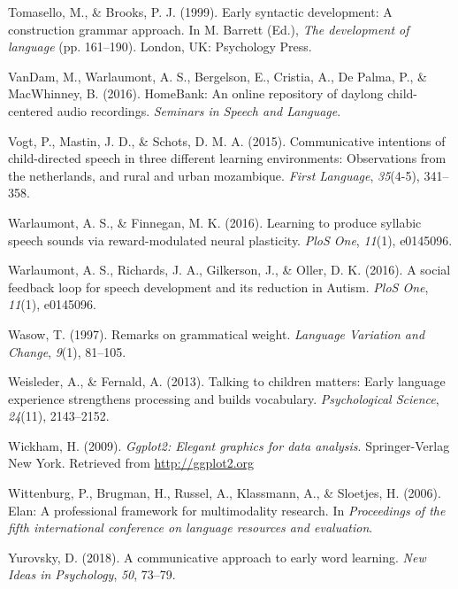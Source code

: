 \documentclass[floatsintext,man]{apa6}
\theoremstyle{definition}
\theoremstyle{definition}
\theoremstyle{definition}
\theoremstyle{remark}
\begin{document}
\hypertarget{ref-tomasello1999early}{}
Tomasello, M., \& Brooks, P. J. (1999). Early syntactic development: A
construction grammar approach. In M. Barrett (Ed.), \emph{The
development of language} (pp. 161--190). London, UK: Psychology Press.

\hypertarget{ref-HomeBank}{}
VanDam, M., Warlaumont, A. S., Bergelson, E., Cristia, A., De Palma, P.,
\& MacWhinney, B. (2016). HomeBank: An online repository of daylong
child-centered audio recordings. \emph{Seminars in Speech and Language}.

\hypertarget{ref-vogt2015communicative}{}
Vogt, P., Mastin, J. D., \& Schots, D. M. A. (2015). Communicative
intentions of child-directed speech in three different learning
environments: Observations from the netherlands, and rural and urban
mozambique. \emph{First Language}, \emph{35}(4-5), 341--358.

\hypertarget{ref-warlaumont2016learning}{}
Warlaumont, A. S., \& Finnegan, M. K. (2016). Learning to produce
syllabic speech sounds via reward-modulated neural plasticity.
\emph{PloS One}, \emph{11}(1), e0145096.

\hypertarget{ref-warlaumont2014social}{}
Warlaumont, A. S., Richards, J. A., Gilkerson, J., \& Oller, D. K.
(2016). A social feedback loop for speech development and its reduction
in Autism. \emph{PloS One}, \emph{11}(1), e0145096.

\hypertarget{ref-wasow1997remarks}{}
Wasow, T. (1997). Remarks on grammatical weight. \emph{Language
Variation and Change}, \emph{9}(1), 81--105.

\hypertarget{ref-weisleder2013talking}{}
Weisleder, A., \& Fernald, A. (2013). Talking to children matters: Early
language experience strengthens processing and builds vocabulary.
\emph{Psychological Science}, \emph{24}(11), 2143--2152.

\hypertarget{ref-R-ggplot2}{}
Wickham, H. (2009). \emph{Ggplot2: Elegant graphics for data analysis}.
Springer-Verlag New York. Retrieved from \url{http://ggplot2.org}

\hypertarget{ref-ELAN}{}
Wittenburg, P., Brugman, H., Russel, A., Klassmann, A., \& Sloetjes, H.
(2006). Elan: A professional framework for multimodality research. In
\emph{Proceedings of the fifth international conference on language
resources and evaluation}.

\hypertarget{ref-yurovsky2018communicative}{}
Yurovsky, D. (2018). A communicative approach to early word learning.
\emph{New Ideas in Psychology}, \emph{50}, 73--79.

\endgroup
\end{document}
